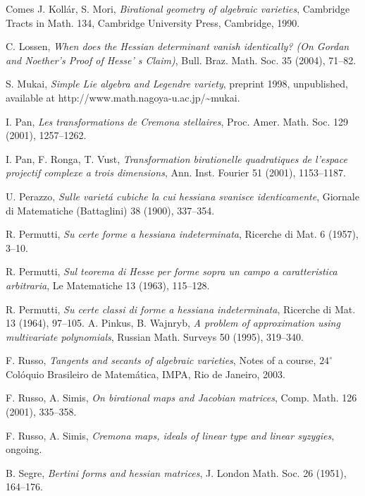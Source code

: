 \documentclass[11pt]{article}   %
\theoremstyle{definition}
\numberwithin{Theorem}{section} \numberwithin{equation}{section}
\begin{document}
{{\begin{thebibliography}{Comes}
 J. Koll\'ar, S. Mori, {\it Birational geometry of algebraic varieties},
Cambridge Tracts in Math.
 134,  Cambridge
University Press, Cambridge, 1990.

 C. Lossen, {\it When does the Hessian determinant vanish identically?
{\rm (}On Gordan and Noether's Proof of Hesse' s Claim{\rm )}}, Bull. Braz. Math. Soc. 35 (2004), 71--82.


 S. Mukai, {\it Simple Lie algebra and Legendre variety},
preprint 1998, unpublished, available at http://www.math.nagoya-u.ac.jp/\~{}mukai.

 I. Pan, {\it Les transformations de Cremona stellaires}, Proc. Amer. Math.
   Soc.  129 (2001),  1257--1262.

 I. Pan, F. Ronga, T. Vust, {\it Transformation
birationelle quadratiques de l'espace projectif complexe a trois
dimensions}, Ann. Inst. Fourier  51 (2001), 1153--1187.

 U. Perazzo, {\it Sulle variet\' a cubiche la
cui hessiana svanisce identicamente}, Giornale di Matematiche (Battaglini)  38  (1900),
337--354.

 R. Permutti, {\it Su certe forme a
hessiana indeterminata}, Ricerche di Mat. 6 (1957), 3--10.

 R. Permutti, {\it Sul teorema di Hesse
per forme sopra un campo a caratteristica arbitraria}, Le Matematiche
13 (1963), 115--128.

 R. Permutti, {\it Su certe classi di forme a
hessiana indeterminata}, Ricerche di Mat.  13 (1964), 97--105.
 A. Pinkus, B. Wajnryb, {\it A problem of
approximation using multivariate polynomials}, Russian Math.
Surveys 50 (1995), 319--340.

 F. Russo, {\it Tangents and secants of algebraic
varieties}, Notes of a course, $24^ \circ$ Col\'oquio Brasileiro de
Matem\'atica, IMPA, Rio de Janeiro, 2003.


 F. Russo, A. Simis, {\it On birational maps and Jacobian matrices},
Comp. Math. 126 (2001), 335--358.

 F. Russo, A. Simis, {\it Cremona maps, ideals of linear
type and linear syzygies}, ongoing.


 B. Segre, {\it Bertini forms and hessian
matrices}, J. London Math. Soc. 26 (1951), 164--176.


\end{thebibliography}}}
\end{document}

